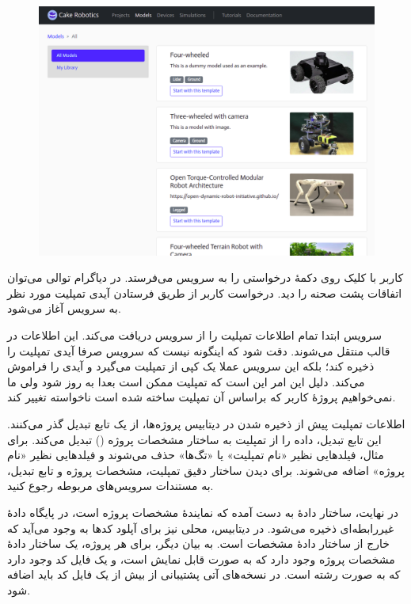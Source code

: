 \documentclass{cake-classes/short-report-fa}
\newcommand{\ورب}[1]{\lr{\Verb!#1!}}
\begin{document}
\begin{figure}[h]
	\centering
	\includegraphics[width=\linewidth]{img/templates.png}
\end{figure}

کاربر با کلیک روی دکمهٔ  درخواستی را به سرویس  می‌فرستد. در دیاگرام توالی می‌توان اتفاقات پشت صحنه را دید. درخواست کاربر از طریق فرستادن آیدی تمپلیت مورد نظر به سرویس  آغاز می‌شود.

سرویس  ابتدا تمام اطلاعات تمپلیت را از سرویس  دریافت می‌کند. این اطلاعات در قالب  منتقل می‌شوند. دقت شود که اینگونه نیست که سرویس  صرفا آیدی تمپلیت را ذخیره کند؛ بلکه این سرویس عملا یک کپی از تمپلیت می‌گیرد و آیدی را فراموش می‌کند. دلیل این امر این است که تمپلیت ممکن است بعدا به روز شود ولی ما نمی‌خواهیم پروژهٔ کاربر که براساس آن تمپلیت ساخته شده است ناخواسته تغییر کند.

اطلاعات تمپلیت پیش از ذخیره شدن در دیتابیس پروژه‌ها، از یک تابع تبدیل گذر می‌کنند. این تابع تبدیل، داده‌ را از تمپلیت به ساختار مشخصات پروژه () تبدیل می‌کند. برای مثال، فیلدهایی نظیر «نام تمپلیت» یا «تگ‌ها» حذف می‌شوند و فیلدهایی نظیر «نام پروژه» اضافه می‌شوند. برای دیدن ساختار دقیق تمپلیت، مشخصات پروژه و تابع تبدیل، به مستندات سرویس‌های مربوطه رجوع کنید.

در نهایت، ساختار دادهٔ به دست آمده که نمایندهٔ مشخصات پروژه است، در پایگاه دادهٔ غیررابطه‌ای  ذخیره می‌شود. در دیتابیس، محلی نیز برای آپلود کدها به وجود می‌آید که خارج از ساختار دادهٔ مشخصات است. به بیان دیگر، برای هر پروژه، یک ساختار دادهٔ مشخصات پروژه وجود دارد که به صورت  قابل نمایش است، و یک فایل کد وجود دارد که به صورت رشته است. در نسخه‌های آتی پشتیبانی از بیش از یک فایل کد باید اضافه شود.
\end{document}
